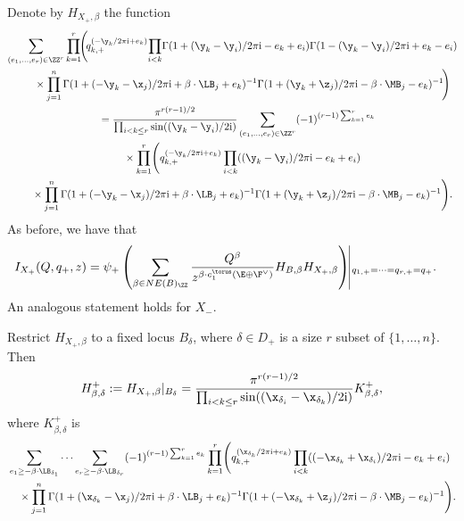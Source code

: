 Denote by $H_{X_+, \beta}$ the function
\begin{gather*}
 \sum_{(e_1, \dots, e_r) \in \ZZ^r} \prod_{k=1}^r\! \Biggl(\!q_{k, +}^{(-\y_k/2\pi {\rm i} + e_k)}
\!\prod_{i < k}\! \Gamma(1 + (\y_k - \y_i)/2 \pi {\rm i} - e_k + e_i) \Gamma(1 - (\y_k - \y_i)/2 \pi {\rm i} + e_k - e_i)\! \\
\quad\quad{}\times \prod_{j=1}^n\Gamma(1+(-\y_k-\x_j)/2 \pi {\rm i}+\beta\cdot \LB_j+e_k)^{-1}\Gamma(1+(\y_k+\z_j)/2 \pi {\rm i}-\beta\cdot \MB_j-e_k)^{-1}\!\Biggr)
\\
\quad{} = \frac{\pi^{r(r-1)/2}}{\prod_{i<k\leq r} \sin((\y_k - \y_i)/2{\rm i})} \sum_{(e_1, \dots, e_r) \in \ZZ^r} (-1)^{(r-1) \sum_{k=1}^r e_k}
 \\
\qquad{} \times \prod_{k=1}^r \Biggl(q_{k, +}^{(-\y_k/2\pi {\rm i} + e_k)}
\prod_{i < k} ((\y_k - \y_i)/2 \pi {\rm i} - e_k + e_i)
 \\
\qquad{}\times \prod_{j=1}^n\Gamma(1+(-\y_k-\x_j)/2 \pi {\rm i}+\beta\cdot \LB_j+e_k)^{-1}\Gamma(1+(\y_k+\z_j)/2 \pi {\rm i}-\beta\cdot \MB_j-e_k)^{-1}\Biggr).
\end{gather*}
As before, we have that
\begin{align}\label{ItoH3} I_{X_+}(Q, q_+, z) &{}= \psi_+ \left( \sum_{\beta \in NE(B)_\ZZ} \frac{Q^\beta}{z^{\beta \cdot c_1^\torus(\E \oplus \F^\vee)}} H_{B, \beta} H_{X_+, \beta} \right)\vline_{q_{1, +} = \cdots =q_{r, +} = q_+}.
\end{align}
An analogous statement holds for $X_-$.

Restrict $H_{X_+, \beta}$ to a fixed locus $B_\delta$, where $\delta \in D_+$ is a size $r$ subset of $\{1, \dots, n\}$. Then
\begin{equation}\label{HBP}
 H^{+}_{\beta, \delta} := H_{X_+, \beta}|_{B_\delta} =
\frac{\pi^{r(r-1)/2}}{\prod_{i<k\leq r} \sin((\x_{\delta_i} - \x_{\delta_k})/2{\rm i})} K^{+}_{\beta, \delta},
\end{equation}
where $K^{+}_{\beta, \delta}$ is
\begin{align*}
&\sum_{e_1 \geq - \beta \cdot \LB_{\delta_1}} \cdots \sum _{e_r \geq - \beta \cdot \LB_{\delta_r}} (-1)^{(r-1) \sum_{k=1}^r e_k}\prod_{k=1}^r \Biggl(q_{k, +}^{( \x_{\delta_k}/2\pi {\rm i} + e_k)}
\prod_{i < k} ((- \x_{\delta_k} + \x_{\delta_i})/2 \pi {\rm i} - e_k + e_i)
 \\
& \quad{}\times \prod_{j=1}^n\Gamma (1+ (\x_{\delta_k}-\x_j )/2 \pi {\rm i}+\beta\cdot \LB_j+e_k )^{-1}\Gamma (1+ (-\x_{\delta_k}+\z_j )/2 \pi {\rm i}-\beta\cdot \MB_j-e_k )^{-1}\Biggr).
\end{align*}

